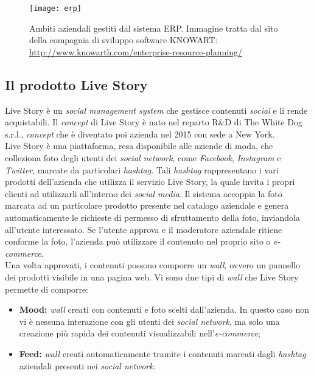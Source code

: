 \label{ERP}
\begin{figure}[ht]
	\begin{center}
		\texttt{[image: erp]}
		\hypertarget{f1.3}{\caption{Ambiti aziendali gestiti dal sistema ERP. Immagine tratta dal sito della compagnia di sviluppo software KNOWART: \url{http://www.knowarth.com/enterprise-resource-planning/}}}
	\end{center}
\end{figure}
\FloatBarrier

\subsection{Il prodotto Live Story}

Live Story è un \textit{social management system} che gestisce contenuti \textit{social} e li rende acquistabili. Il \textit{concept} di Live Story è nato nel reparto R\&D di The White Dog s.r.l., \textit{concept} che è diventato poi azienda nel 2015 con sede a New York. \\
Live Story è una piattaforma, resa disponibile alle aziende di moda, che colleziona foto degli utenti dei \textit{social network}, come \textit{Facebook}, \textit{Instagram} e \textit{Twitter}, marcate da particolari \textit{hashtag}. Tali \textit{hashtag} rappresentano i vari prodotti dell'azienda che utilizza il servizio Live Story, la quale invita i propri clienti ad utilizzarli all'interno dei \textit{social media}. Il sistema accoppia la foto marcata ad un particolare prodotto presente nel catalogo aziendale e genera automaticamente le richieste di permesso di sfruttamento della foto, inviandola all'utente interessato. Se l'utente approva e il moderatore aziendale ritiene conforme la foto, l'azienda può utilizzare il contenuto nel proprio sito o \textit{e-commerce}. \\
Una volta approvati, i contenuti possono comporre un \textit{wall}, ovvero un pannello dei prodotti visibile in una pagina web. Vi sono due tipi di \textit{wall} che Live Story permette di comporre:

\begin{itemize}
	\item \textbf{Mood:} \textit{wall} creati con contenuti e foto scelti dall'azienda. In questo caso non vi è nessuna interazione con gli utenti dei \textit{social network}, ma solo una creazione più rapida dei contenuti visualizzabili nell'\textit{e-commerce};
	\item \textbf{Feed:} \textit{wall} creati automaticamente tramite i contenuti marcati dagli \textit{hashtag} aziendali presenti nei \textit{social network}.
\end{itemize}


